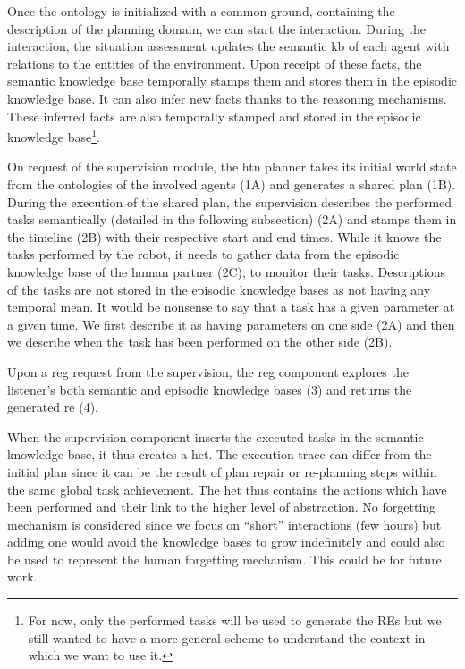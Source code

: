 Once the ontology is initialized with a common ground, containing the description of the planning domain, we can start the interaction. During the interaction, the situation assessment updates the semantic \acrshort{kb} of each agent with relations to the entities of the environment. Upon receipt of these facts, the semantic knowledge base temporally stamps them and stores them in the episodic knowledge base. It can also infer new facts thanks to the reasoning mechanisms. These inferred facts are also temporally stamped and stored in the episodic knowledge base\footnote{For now, only the performed tasks will be used to generate the REs but we still wanted to have a more general scheme to understand the context in which we want to use it.}.

On request of the supervision module, the \acrshort{htn} planner takes its initial world state from the ontologies of the involved agents (1A) and generates a shared plan (1B). During the execution of the shared plan, the supervision describes the performed tasks semantically (detailed in the following subsection) (2A) and stamps them in the timeline (2B) with their respective start and end times. While it knows the tasks performed by the robot, it needs to gather data from the episodic knowledge base of the human partner (2C), to monitor their tasks. Descriptions of the tasks are not stored in the episodic knowledge bases as not having any temporal mean. It would be nonsense to say that a task has a given parameter at a given time. We first describe it as having parameters on one side (2A) and then we describe when the task has been performed on the other side (2B). 

Upon a \acrshort{reg} request from the supervision, the \acrshort{reg} component explores the listener's both semantic and episodic knowledge bases (3) and returns the generated \acrshort{re} (4).

When the supervision component inserts the executed tasks in the semantic knowledge base, it thus creates a \acrfull{het}. The execution trace can differ from the initial plan since it can be the result of plan repair or re-planning steps within the same global task achievement. The \acrshort{het} thus contains the actions which have been performed and their link to the higher level of abstraction. No forgetting mechanism is considered since we focus on ``short'' interactions (few hours) but adding one would avoid the knowledge bases to grow indefinitely and could also be used to represent the human forgetting mechanism. This could be for future work.

